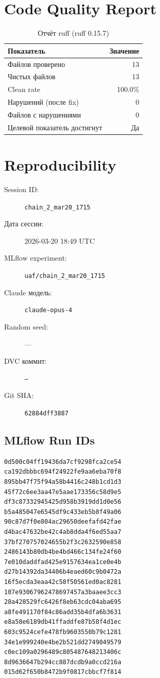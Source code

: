 \documentclass[12pt,a4paper]{article}
\begin{document}
\section{Code Quality Report}

\begin{table}[H]
\centering
\caption{Отчёт ruff (ruff 0.15.7)}
\begin{tabular}{lr}
\toprule
Показатель & Значение \\
\midrule
Файлов проверено & 13 \\
Чистых файлов & 13 \\
Clean rate & \textcolor{passcolor}{100.0\%} \\
Нарушений (после fix) & \textcolor{passcolor}{0} \\
Файлов с нарушениями & 0 \\
Целевой показатель достигнут & \textcolor{passcolor}{Да} \\
\bottomrule
\end{tabular}
\end{table}





\section{Reproducibility}

\begin{description}
    \item[Session ID:] \texttt{chain\_2\_mar20\_1715}
    \item[Дата сессии:] 2026-03-20 18:49 UTC
    \item[MLflow experiment:] \texttt{uaf/chain\_2\_mar20\_1715}
    \item[Claude модель:] \texttt{claude-opus-4}
    \item[Random seed:] ---
    \item[DVC коммит:] \texttt{---}
    \item[Git SHA:] \texttt{62884dff3887}
\end{description}

\subsection*{MLflow Run IDs}

\begin{lstlisting}
0d500c04ff19436da7cf9298fca2ce54
ca192dbbbc694f24922fe9aa6eba70f8
895bb47f75f94a58b4416c248b1cd1d3
45f72c6ee3aa47e5aae173356c58d9e5
df3c87332945425d958b3919dd1d0e56
b5a485047e6545df9c433eb5b8f49a06
90c87d7f0e804ac29650deefafd42fae
d4bac47632be42c4ab8dda4f6ed55aa7
37bf270757024655b2f3c2632590e858
2486143b80db4be4bd466c134fe24f60
7e010daddfad425e9157634ea1ce0e4b
d27b14392da34406b4eaed60c9b0472a
16f5ecda3eaa42c58f50561ed0ac8281
107e93067962478697457a3baaee3cc3
28a428529fc6426f8eb63cdc04aba695
a8fe491170f84c86add35b4dfa6b3631
e8a58e6189db41ffaddfe87b58f4d1ec
603c9524cefe478fb9603550b79c1281
34e1e999240e4be2b521dd2749049579
c0ec109a0296489c805487648213406c
8d9636647b294cc887dcdb9a0ccd216a
015d62f650b8472b9f0817cbbcf7f814
\end{lstlisting}
\end{document}
